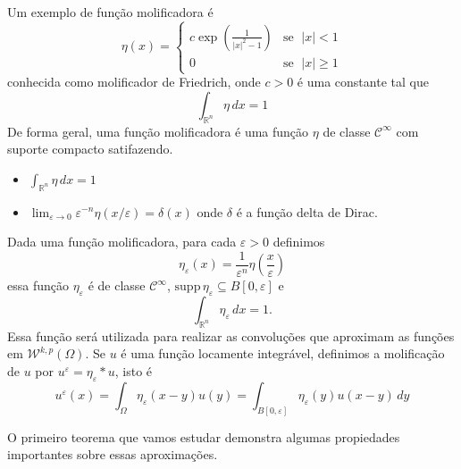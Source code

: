\documentclass[a4paper, 11pt]{book}
\theoremstyle{definition}
\newcommand{\bR}{\mathbb{R}}
\newcommand{\cC}{\mathcal{C}}
\newcommand{\cW}{\mathcal{W}}
\newcommand{\supp}{\mathrm{supp}\,}
\begin{document}
Um exemplo de função molificadora é
\begin{equation} \label{eq:molificador-friedrich}
    \eta(x) =
    \left\{
        \begin{array}{lr}
            c \exp \left( \frac{1}{|x|^2 - 1} \right) & \text{se }\; |x| < 1\\
            0 & \text{se }\; |x| \geqslant 1
        \end{array}
    \right.
\end{equation}
conhecida como molificador de Friedrich, onde $c > 0$ é uma constante tal que
\[
    \int_{\bR^n} \eta \,dx = 1
\]
De forma geral, uma função molificadora é uma função $\eta$ de classe $\cC^\infty$ com suporte compacto satifazendo. 
\begin{itemize}[leftmargin=*, label=\textbf{--}]
    \item $\displaystyle \int_{\bR^n} \eta \,dx = 1$
    \item $\displaystyle \lim_{\varepsilon \to 0} \varepsilon^{-n}\eta(x/\varepsilon) = \delta(x)$ onde $\delta$ é a função delta de Dirac.
\end{itemize}
Dada uma função molificadora, para cada $\varepsilon > 0$ definimos
\begin{equation} \label{eq:eta-epsilon}
    \eta_\varepsilon(x) = \frac{1}{\varepsilon^n} \eta\left( \frac{x}{\varepsilon} \right)
\end{equation}
essa função $\eta_\varepsilon$ é de classe $\cC^\infty$, $\supp \eta_\varepsilon \subseteq B[0,\varepsilon]$ e
\[
    \int_{\bR^n} \eta_\varepsilon \,dx = 1.
\]
Essa função será utilizada para realizar as convoluções que aproximam as funções em $\cW^{k,p}(\Omega)$. Se $u$ é uma função locamente integrável, definimos a molificação de $u$ por $u^\varepsilon = \eta_\varepsilon * u$, isto é
\[
    u^\varepsilon(x) = \int_\Omega \eta_\varepsilon(x-y) u(y) = \int_{B[0,\varepsilon]} \eta_\varepsilon(y) u(x-y) \,dy
\]

O primeiro teorema que vamos estudar demonstra algumas propiedades importantes sobre essas aproximações.
\end{document}
